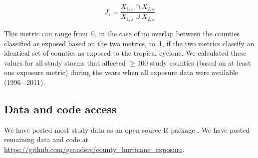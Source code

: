 \begin{equation} 
J_s = \frac{X_{1,s} \cap X_{2,s}}{X_{1,s} \cup X_{2,s}}
\end{equation}

\noindent This metric can range from~0, in the case of no overlap between the
counties classified as exposed based on the two metrics, to~1, if
the two metrics classify an identical set of counties as exposed to the
tropical cyclone. We calculated these values for all study storms that affected
$\ge$100 study counties (based on at least one exposure metric) during the
years when all exposure data were available (1996\,--\,2011).

\subsection*{Data and code access}

We have posted most study data as an open-source R package
\parencite{hurricaneexposuredata}. We have posted remaining data and code at
\url{https://github.com/geanders/county_hurricane_exposure}.
